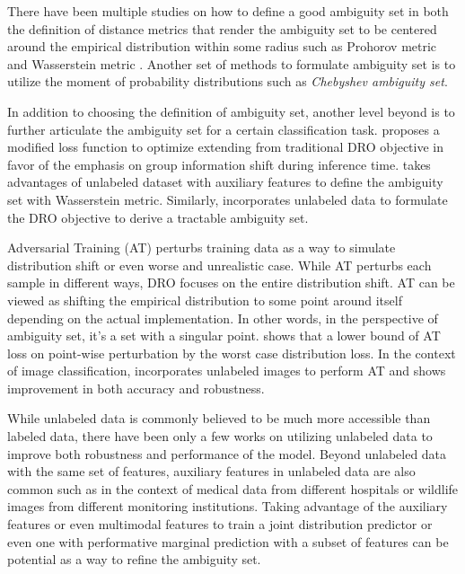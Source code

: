 \documentclass{article}
\begin{document}
There have been multiple studies on how to define a good ambiguity set in both 
the definition of distance metrics that render the ambiguity set to be centered 
around the empirical distribution within some radius such as Prohorov metric
\citep{Erdogan2006AmbiguousCC} and Wasserstein metric \citep{esfahani2015data}.
Another set of methods to formulate ambiguity set is to utilize the moment of 
probability distributions such as \textit{Chebyshev ambiguity set}. 
\citep{rahimian2019distributionally}

In addition to choosing the definition of ambiguity set, another level beyond 
is to further articulate the ambiguity set for a certain classification task. 
\citep{sagawa2019distributionally} proposes a modified loss function 
to optimize extending from traditional DRO objective in favor of the emphasis 
on group information shift during inference time. \citep{awasthi2022distributionally}
takes advantages of unlabeled dataset with auxiliary features to define 
the ambiguity set with Wasserstein metric. Similarly, \citep{frogner2019incorporating}
incorporates unlabeled data to formulate the DRO objective to derive a 
tractable ambiguity set. 

Adversarial Training (AT) perturbs training data as a way to simulate distribution 
shift or even worse and unrealistic case. While AT perturbs 
each sample in different ways, DRO focuses on the entire distribution shift. 
AT can be viewed as shifting the empirical distribution to some point around 
itself depending on the actual implementation. In other words, in the perspective
of ambiguity set, it's a set with a singular point. \citep{Staib2017DistributionallyRD}
shows that a lower bound of AT loss on point-wise perturbation by the worst case 
distribution loss. In the context of image classification, \citep{carmon2019unlabeled}
incorporates unlabeled images to perform AT and shows improvement in both accuracy 
and robustness.

While unlabeled data is commonly believed to be much more accessible than 
labeled data, there have been only a few works on utilizing unlabeled 
data to improve both robustness and performance of the model. Beyond 
unlabeled data with the same set of features, auxiliary features in 
unlabeled data are also common such as in the context of medical data 
from different hospitals or wildlife images from different monitoring
institutions. Taking advantage of the auxiliary features or even 
multimodal features to train a joint distribution predictor or even 
one with performative marginal prediction with a subset of features
can be potential as a way to refine the ambiguity set.
\end{document}
